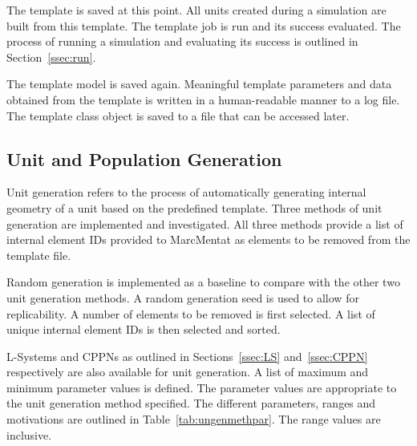 The template is saved at this point. All units created during a simulation are built from this template. The template job is run and its success evaluated. The process of running a simulation and evaluating its success is outlined in Section~\ref{ssec:run}.

The template model is saved again. Meaningful template parameters and data obtained from the template is written in a human-readable manner to a log file. The template class object is saved to a file that can be accessed later.

\subsection{Unit and Population Generation}
\label{ssec:uapg}

Unit generation refers to the process of automatically generating internal geometry of a unit based on the predefined template. Three methods of unit generation are implemented and investigated. All three methods provide a list of internal element IDs provided to MarcMentat as elements to be removed from the template file.

Random generation is implemented as a baseline to compare with the other two unit generation methods. A random generation seed is used to allow for replicability. A number of elements to be removed is first selected. A list of unique internal element IDs is then selected and sorted.

L-Systems and CPPNs as outlined in Sections~\ref{ssec:LS} and~\ref{ssec:CPPN} respectively are also available for unit generation. A list of maximum and minimum parameter values is defined. The parameter values are appropriate to the unit generation method specified. The different parameters, ranges and motivations are outlined in Table~\ref{tab:ungenmethpar}. The range values are inclusive.

